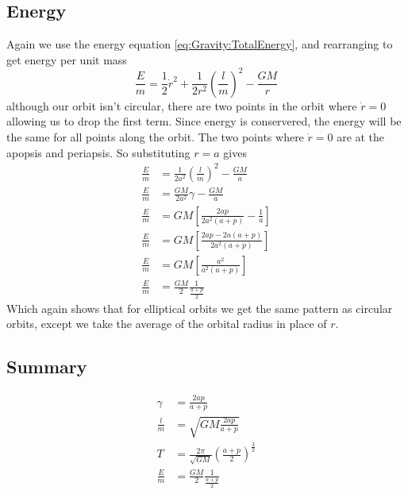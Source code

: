 \subsection{Energy}
Again we use the energy equation \ref{eq:Gravity:TotalEnergy}, and rearranging to get energy per unit mass
\begin{equation}
\frac{E}{m}=\frac{1}{2} \dot{r}^2 +\frac{1}{2r^2} \left(\frac{l}{m}\right)^2- \frac{GM}{r}
\end{equation}
although our orbit isn't circular, there are two points in the orbit where $\dot{r}=0$ allowing us to drop the first term. Since energy is conservered, the energy will be the same for all points along the orbit. The two points where $\dot{r}=0$ are at the apopsis and periapsis. So substituting $r=a$ gives
\begin{align}
\frac{E}{m}&=\frac{1}{2a^2} \left(\frac{l}{m}\right)^2- \frac{GM}{a}\nonumber \\
\frac{E}{m}&=\frac{GM}{2a^2} \gamma- \frac{GM}{a}\nonumber \\
\frac{E}{m}&=GM\left[\frac{2ap}{2a^2(a+p)} - \frac{1}{a}\right] \nonumber \\
\frac{E}{m}&=GM\left[\frac{2ap-2a(a+p)}{2a^2(a+p)}\right] \nonumber \\
\frac{E}{m}&=GM\left[\frac{a^2}{a^2(a+p)}\right] \nonumber \\
\frac{E}{m}&=\frac{GM}{2}\frac{1}{\frac{a+p}{2}}
\end{align}
Which again shows that for elliptical orbits we get the same pattern as circular orbits, except we take the average of the orbital radius in place of $r$.
\begin{framed}
\subsection{Summary}
\begin{align*}
\gamma&=\frac{2ap}{a+p}\\
\frac{l}{m}&=\sqrt{GM\frac{2ap}{a+p}}\\
T &=\frac{2\pi}{\sqrt{GM}}\left(\frac{a+p}{2}\right)^\frac{3}{2}\\
\frac{E}{m}&=\frac{GM}{2}\frac{1}{\frac{a+p}{2}}
\end{align*}
\end{framed}